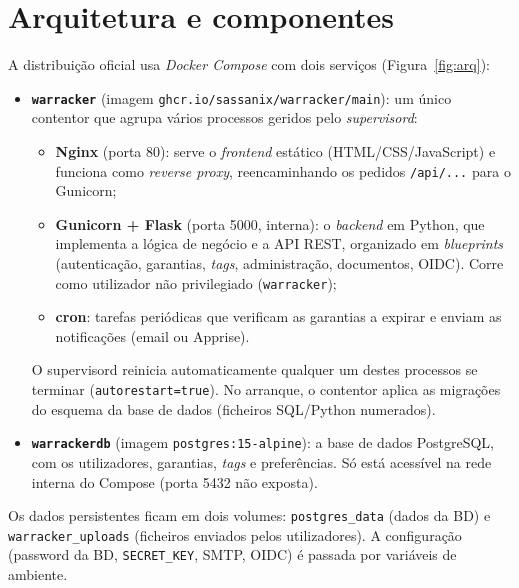 \documentclass[11pt,a4paper]{article}
\newcommand{\code}[1]{\texttt{#1}}
\begin{document}
\section{Arquitetura e componentes}
A distribuição oficial usa \emph{Docker Compose} com dois serviços (Figura~\ref{fig:arq}):

\begin{itemize}
  \item \textbf{\code{warracker}} (imagem \code{ghcr.io/sassanix/warracker/main}): um único contentor que
  agrupa vários processos geridos pelo \emph{supervisord}:
  \begin{itemize}
    \item \textbf{Nginx} (porta 80): serve o \emph{frontend} estático (HTML/CSS/JavaScript) e funciona como
    \emph{reverse proxy}, reencaminhando os pedidos \code{/api/...} para o Gunicorn;
    \item \textbf{Gunicorn + Flask} (porta 5000, interna): o \emph{backend} em Python, que implementa a
    lógica de negócio e a API REST, organizado em \emph{blueprints} (autenticação, garantias, \emph{tags},
    administração, documentos, OIDC). Corre como utilizador não privilegiado (\code{warracker});
    \item \textbf{cron}: tarefas periódicas que verificam as garantias a expirar e enviam as
    notificações (email ou Apprise).
  \end{itemize}
  O supervisord reinicia automaticamente qualquer um destes processos se terminar
  (\code{autorestart=true}).
  No arranque, o contentor aplica as migrações do esquema da base de dados (ficheiros SQL/Python numerados).
  \item \textbf{\code{warrackerdb}} (imagem \code{postgres:15-alpine}): a base de dados PostgreSQL, com os
  utilizadores, garantias, \emph{tags} e preferências. Só está acessível na rede interna do Compose
  (porta 5432 não exposta).
\end{itemize}

Os dados persistentes ficam em dois volumes: \code{postgres\_data} (dados da BD) e
\code{warracker\_uploads} (ficheiros enviados pelos utilizadores). A configuração (password da BD,
\code{SECRET\_KEY}, SMTP, OIDC) é passada por variáveis de ambiente.
\end{document}
